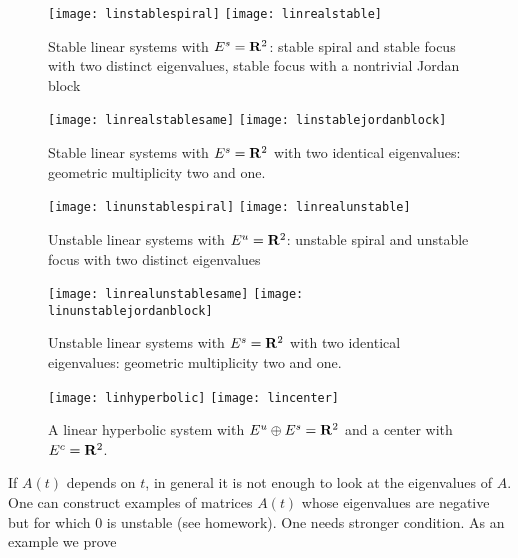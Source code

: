 \documentclass[12pt]{report}
\newcommand{\bR}{{\bf R}}
\begin{document}
\begin{figure}[htbp] 
\begin{center}
\texttt{[image: linstablespiral]}
\texttt{[image: linrealstable]}
\caption{Stable linear systems with $E^s=\bR^2$: stable spiral and
stable focus with two distinct eigenvalues, stable focus with a
nontrivial Jordan block}
\label{stablelinear}
\end{center}
\end{figure}

\begin{figure}[htbp] 
\begin{center}
\texttt{[image: linrealstablesame]}
\texttt{[image: linstablejordanblock]}
\caption{Stable linear systems with $E^s=\bR^2$ with two identical
eigenvalues: geometric multiplicity two and one.}
\label{samestablelinear}
\end{center}
\end{figure}


\begin{figure}[htbp] 
\begin{center}
\texttt{[image: linunstablespiral]}
\texttt{[image: linrealunstable]}
\caption{Unstable linear systems with $E^u=\bR^2$: unstable spiral and
unstable focus with two distinct eigenvalues}
\label{unstablelinear}
\end{center}
\end{figure}

\begin{figure}[htbp] 
\begin{center}
\texttt{[image: linrealunstablesame]}
\texttt{[image: linunstablejordanblock]}
\caption{Unstable linear systems with $E^s=\bR^2$ with two identical
eigenvalues: geometric multiplicity two and one.}
\label{sameunstablelinear}
\end{center}
\end{figure}


\begin{figure}[htbp] 
\begin{center}
\texttt{[image: linhyperbolic]}
\texttt{[image: lincenter]}
\caption{A linear hyperbolic system with $E^u \oplus E^s=\bR^2$ and a
center with $E^c=\bR^2$.}
\label{hyperboliccenter}
\end{center}
\end{figure}


If $A(t)$ depends on $t$, in general it is not enough to look at the 
eigenvalues of $A$. One can construct examples of matrices $A(t)$ whose 
eigenvalues are negative but for which $0$ is unstable (see homework). 
One needs stronger condition. As an example we prove 
\end{document}
